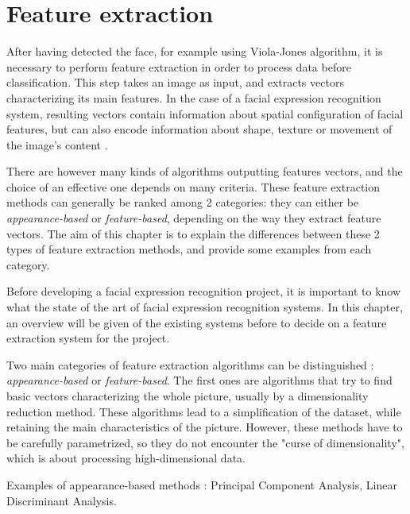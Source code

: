 \chapter{Feature extraction}
\label{chap:extraction}

\noindent After having detected the face, for example using Viola-Jones algorithm, it is necessary to perform feature extraction in order to process data before classification. 
This step takes an image as input, and extracts vectors characterizing its main features. In the case of a facial expression recognition system, resulting vectors contain information about spatial configuration of facial features, but can also encode information about shape, texture or movement of the image's content \cite{CHI03}.
\newline

\noindent There are however many kinds of algorithms outputting features vectors, and the choice of an effective one depends on many criteria. These feature extraction methods can generally be ranked among 2 categories: they can either be \textit{appearance-based} or \textit{feature-based}, depending on the way they extract feature vectors. The aim of this chapter is to explain the differences between these 2 types of feature extraction methods, and provide some examples from each category.
\newline

\vspace{\baselineskip}
\noindent Before developing a facial expression recognition project, it is important to know what the state of the art of facial expression recognition systems. In this chapter, an overview will be given of the existing systems before to decide on a feature extraction system for the project.
\newline

\noindent Two main categories of feature extraction algorithms can be distinguished : \textit{appearance-based} or \textit{feature-based}. The first ones are algorithms that try to find basic vectors characterizing the whole picture, usually by a dimensionality reduction method. These algorithms lead to a simplification of the dataset, while retaining the main characteristics of the picture. However, these methods have to be carefully parametrized, so they do not encounter the "curse of dimensionality", which is about processing high-dimensional data.
\vspace{\baselineskip}

\noindent Examples of appearance-based methods : Principal Component Analysis, Linear Discriminant Analysis.
\newline

